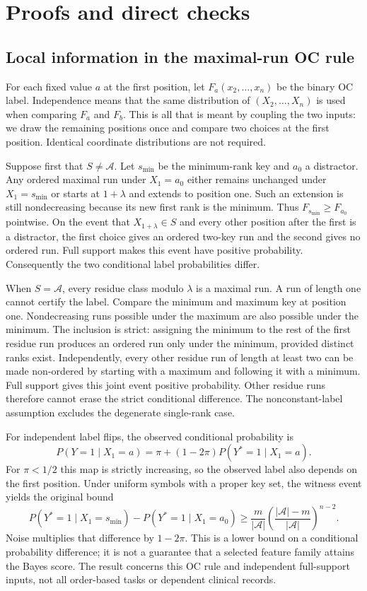 \section{Proofs and direct checks}
\label{app:proofs}
\subsection{Local information in the maximal-run OC rule}
For each fixed value $a$ at the first position, let $F_a(x_2,\ldots,x_n)$ be the binary OC label. Independence means that the same distribution of $(X_2,\ldots,X_n)$ is used when comparing $F_a$ and $F_b$. This is all that is meant by coupling the two inputs: we draw the remaining positions once and compare two choices at the first position. Identical coordinate distributions are not required.

Suppose first that $S\ne\mathcal A$. Let $s_{\min}$ be the minimum-rank key and $a_0$ a distractor. Any ordered maximal run under $X_1=a_0$ either remains unchanged under $X_1=s_{\min}$ or starts at $1+\lambda$ and extends to position one. Such an extension is still nondecreasing because its new first rank is the minimum. Thus $F_{s_{\min}}\geq F_{a_0}$ pointwise. On the event that $X_{1+\lambda}\in S$ and every other position after the first is a distractor, the first choice gives an ordered two-key run and the second gives no ordered run. Full support makes this event have positive probability. Consequently the two conditional label probabilities differ.

When $S=\mathcal A$, every residue class modulo $\lambda$ is a maximal run. A run of length one cannot certify the label. Compare the minimum and maximum key at position one. Nondecreasing runs possible under the maximum are also possible under the minimum. The inclusion is strict: assigning the minimum to the rest of the first residue run produces an ordered run only under the minimum, provided distinct ranks exist. Independently, every other residue run of length at least two can be made non-ordered by starting with a maximum and following it with a minimum. Full support gives this joint event positive probability. Other residue runs therefore cannot erase the strict conditional difference. The nonconstant-label assumption excludes the degenerate single-rank case.

For independent label flips, the observed conditional probability is
\[
P(Y=1\mid X_1=a)=\pi+(1-2\pi)P(Y^*=1\mid X_1=a).
\]
For $\pi<1/2$ this map is strictly increasing, so the observed label also depends on the first position. Under uniform symbols with a proper key set, the witness event yields the original bound
\[
P(Y^*=1\mid X_1=s_{\min})-P(Y^*=1\mid X_1=a_0)
\geq \frac{m}{|\mathcal A|}\left(\frac{|\mathcal A|-m}{|\mathcal A|}\right)^{n-2}.
\]
Noise multiplies that difference by $1-2\pi$. This is a lower bound on a conditional probability difference; it is not a guarantee that a selected feature family attains the Bayes score. The result concerns this OC rule and independent full-support inputs, not all order-based tasks or dependent clinical records.


